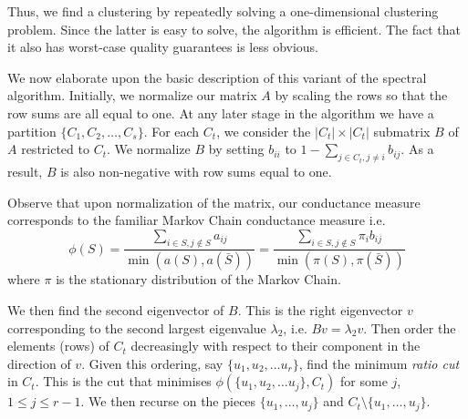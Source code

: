 \documentclass{book}
\numberwithin{exercise}{chapter}
\begin{document}
\bigskip

\begin{center}
\end{center}

Thus, we find a clustering by repeatedly solving a one-dimensional
clustering problem. Since the latter is easy to solve, the algorithm
is efficient. The fact that it also has worst-case quality guarantees
is less obvious.

We now elaborate upon the basic description of this variant of the
spectral algorithm. Initially, we normalize our matrix $A$ by scaling
the rows so that
the row sums are all equal to one. At any later stage in the algorithm
we have a partition $\{C_1,C_2,\dots,C_s\}$. For each
$C_t$, we consider the $|C_t|\times |C_t|$ submatrix $B$
of $A$ restricted to $C_t$. We normalize $B$ by
setting $b_{ii}$ to $1-\sum_{j\in C_t, j\not= i} b_{ij}$. As a result,
$B$ is also non-negative with row sums equal to one.

Observe that upon normalization
of the matrix, our conductance measure corresponds to
the familiar Markov Chain conductance measure i.e.
$$\phi(S) = \frac{\sum_{i \in S, j\not\in S} a_{ij}}{\min(a(S), a(\bar{S}))}
=\frac{\sum_{i \in S, j\not\in S} \pi_i b_{ij}}{\min(\pi(S), \pi(\bar{S}))}$$
where $\pi$ is the stationary distribution of the Markov Chain.

We then find the second eigenvector of $B$. This is
the right eigenvector $v$ corresponding to the second
largest eigenvalue $\lambda_2$, i.e. $Bv=\lambda_2 v$.
Then order the elements (rows) of $C_t$ decreasingly with respect to
their component in the direction of $v$. Given this ordering,
say $\{ u_1,u_2,\ldots u_r\}$, find the minimum {\em ratio cut} in $C_t$.
This is the cut that minimises $\phi ( \{ u_1,u_2,\ldots u_j\}, C_t)$
for some $j$, $1\le j \le r-1$.
We then recurse on the pieces $\{ u_1,\ldots, u_j\}$
and $C_t\setminus \{ u_1,\ldots, u_j\}$.
\end{document}
